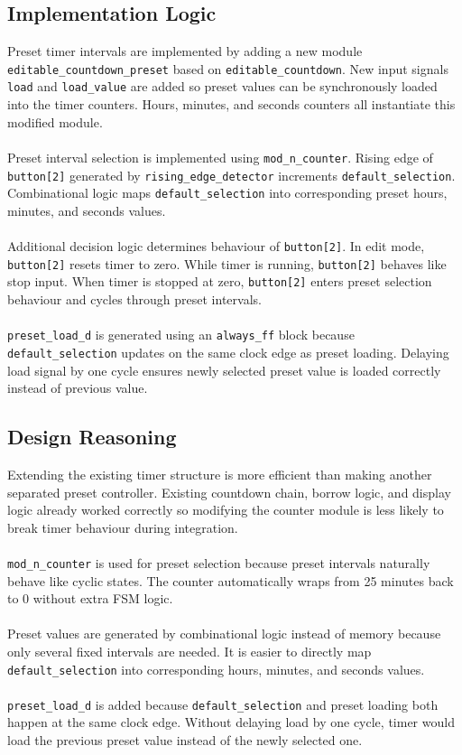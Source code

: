 \documentclass[12pt]{article}
\let\oldtexttt\texttt
\renewcommand{\texttt}[1]{{\fontsize{11pt}{12pt}\selectfont\oldtexttt{#1}}}
\begin{document}
\subsection{Implementation Logic}
	Preset timer intervals are implemented by adding a new module \texttt{editable\_countdown\_preset} based on \texttt{editable\_countdown}. New input signals \texttt{load} and \texttt{load\_value} are added so preset values can be synchronously loaded into the timer counters. Hours, minutes, and seconds counters all instantiate this modified module.\\
	\\
	Preset interval selection is implemented using \texttt{mod\_n\_counter}. Rising edge of \texttt{button[2]} generated by \texttt{rising\_edge\_detector} increments \texttt{default\_selection}. Combinational logic maps \texttt{default\_selection} into corresponding preset hours, minutes, and seconds values.\\
	\\
	Additional decision logic determines behaviour of \texttt{button[2]}. In edit mode, \texttt{button[2]} resets timer to zero. While timer is running, \texttt{button[2]} behaves like stop input. When timer is stopped at zero, \texttt{button[2]} enters preset selection behaviour and cycles through preset intervals.\\
	\\
	\texttt{preset\_load\_d} is generated using an \texttt{always\_ff} block because \texttt{default\_selection} updates on the same clock edge as preset loading. Delaying load signal by one cycle ensures newly selected preset value is loaded correctly instead of previous value.

\subsection{Design Reasoning}
	Extending the existing timer structure is more efficient than making another separated preset controller. Existing countdown chain, borrow logic, and display logic already worked correctly so modifying the counter module is less likely to break timer behaviour during integration.\\
	\\
	\texttt{mod\_n\_counter} is used for preset selection because preset intervals naturally behave like cyclic states. The counter automatically wraps from 25 minutes back to 0 without extra FSM logic.\\
	\\
	Preset values are generated by combinational logic instead of memory because only several fixed intervals are needed. It is easier to directly map \texttt{default\_selection} into corresponding hours, minutes, and seconds values.\\
	\\
	\texttt{preset\_load\_d} is added because \texttt{default\_selection} and preset loading both happen at the same clock edge. Without delaying load by one cycle, timer would load the previous preset value instead of the newly selected one.
\end{document}
